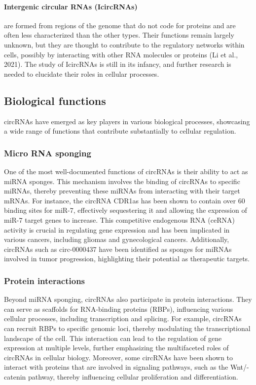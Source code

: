 \paragraph{Intergenic circular RNAs (IcircRNAs)} are formed from regions of the
genome
that do not code for proteins and are often less characterized than the other
types.
Their functions remain largely unknown, but they are thought to contribute to
the regulatory networks within cells, possibly by interacting with other RNA
molecules or proteins (Li et al., 2021).
The study of IcircRNAs is still in its infancy, and further research is needed
to elucidate their roles in cellular processes.

\subsection{Biological functions}
\label{sec:circrna_functions}
circRNAs have emerged as key players in various biological processes,
showcasing
a wide range of functions that contribute substantially to cellular regulation.

\subsubsection{Micro RNA sponging}
One of the most well-documented functions of circRNAs is their ability to act
as miRNA sponges.
This mechanism involves the binding of circRNAs to specific miRNAs, thereby
preventing these miRNAs from interacting with their target mRNAs.
For instance, the circRNA CDR1as has been shown to contain over 60 binding
sites for miR-7, effectively sequestering it and allowing the expression of
miR-7 target genes to
increase\supercite{guo_expanded_2014,yuan_regulatory_2020}.
This competitive endogenous RNA (ceRNA) activity is crucial in regulating gene
expression and has been implicated in various cancers, including gliomas and
gynecological cancers\supercite{dong_expression_2020,song_circular_2016}.
Additionally, circRNAs such as circ-0000437 have been identified as sponges for
miRNAs involved in tumor progression, highlighting their potential as
therapeutic targets\supercite{li_peptide_2021,cui_circular_2022}.

\subsubsection{Protein interactions}
Beyond miRNA sponging, circRNAs also participate in protein interactions.
They can serve as scaffolds for RNA-binding proteins (RBPs), influencing
various cellular processes, including transcription and
splicing\supercite{li_comprehensive_2017,qu_emerging_2017}.
For example, circRNAs can recruit RBPs to specific genomic loci, thereby
modulating the transcriptional landscape of the
cell\supercite{li_comprehensive_2017}.
This interaction can lead to the regulation of gene expression at multiple
levels, further emphasizing the multifaceted roles of circRNAs in cellular
biology\supercite{zhang_important_2024,he_targeting_2021}.
Moreover, some circRNAs have been shown to interact with proteins that are
involved in signaling pathways, such as the Wnt/\textbeta{}-catenin pathway,
thereby influencing cellular proliferation and
differentiation\supercite{peng_novel_2021}.

